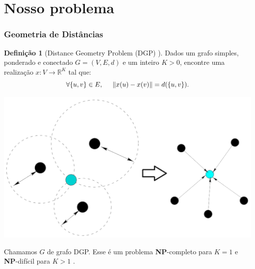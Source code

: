 \documentclass[10pt]{beamer}
\theoremstyle{plain}
\theoremstyle{definition}
\newtheorem{definicao}{Definição}[section]
\begin{document}
	\section{Nosso problema}
	
	\begin{frame}
		\frametitle{\normalsize Geometria de Distâncias} 
		{
			\small
			\begin{definicao}[Distance Geometry Problem (DGP) \cite{carlileGDandAplications}]
				Dados um grafo simples, ponderado e conectado $G = (V, E, d)$ e um inteiro $K>0$, encontre uma realização $x: V \longrightarrow \mathbb{R}^K$ tal que:
				\begin{equation*}
					\forall \{u,v\} \in E, \hspace{0.5cm} \lVert x(u) - x(v) \rVert = d(\{u,v\}). \label{eq:DGP}
				\end{equation*}	
			\end{definicao}
			\begin{center}
				\includegraphics[width=0.5\linewidth]{dgp.png}
			\end{center}
		
			Chamamos $G$ de grafo DGP. Esse é um problema \textbf{NP}-completo para $K = 1$ e \textbf{NP}-difícil para $K>1$ \cite{Saxe:79}.
			}	
	\end{frame}
\end{document}
